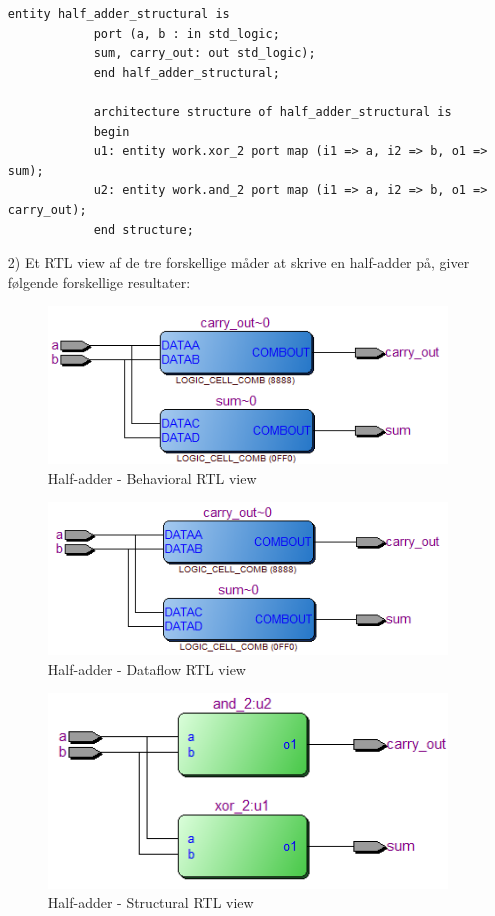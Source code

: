 \begin{enumerate}
\begin{lstlisting}[caption={Structural half-adder kode},label={lst:StruHalfAddCode}]
			entity half_adder_structural is
			port (a, b : in std_logic;
			sum, carry_out: out std_logic);
			end half_adder_structural;
			
			architecture structure of half_adder_structural is
			begin
			u1: entity work.xor_2 port map (i1 => a, i2 => b, o1 => sum);
			u2: entity work.and_2 port map (i1 => a, i2 => b, o1 => carry_out);
			end structure;
			\end{lstlisting}
	\item[2)]
	Et RTL view af de tre forskellige måder at skrive en half-adder på, giver følgende forskellige resultater:\\
\begin{figure}[h]
	\centering
\includegraphics[scale=0.8]{pictures/Oevelse1/Half_adder/Behavioral.JPG}
\caption{Half-adder - Behavioral RTL view}
\label{fig:HaBehavioralRTL}
\end{figure}

\begin{figure}[h]
	\centering
	\includegraphics[scale=0.8]{pictures/Oevelse1/Half_adder/dataflow.JPG}
	\caption{Half-adder - Dataflow RTL view}
	\label{fig:HaDataflowRTL}
\end{figure}

\begin{figure}[h]
	\centering
	\includegraphics[scale=0.8]{pictures/Oevelse1/Half_adder/Structural.JPG}
	\caption{Half-adder - Structural RTL view}
	\label{fig:HaStructuralRTL}
\end{figure}
	\newpage
	

\end{enumerate}
